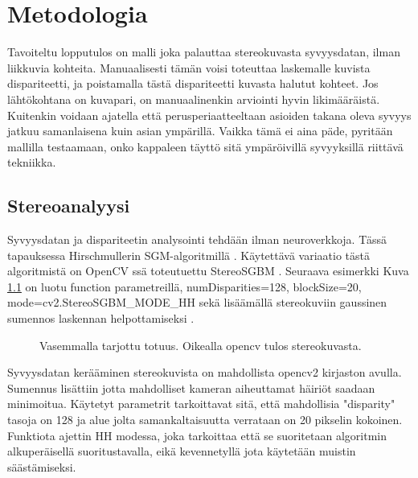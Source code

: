 \chapter{Metodologia}
\label{ch:metodologia}

Tavoiteltu lopputulos on malli joka palauttaa stereokuvasta syvyysdatan, ilman liikkuvia kohteita.
Manuaalisesti tämän voisi toteuttaa laskemalle kuvista dispariteetti, ja poistamalla tästä dispariteetti kuvasta halutut kohteet.
Jos lähtökohtana on kuvapari, on manuaalinenkin arviointi hyvin likimääräistä. Kuitenkin voidaan ajatella että perusperiaatteeltaan asioiden takana oleva syvyys jatkuu samanlaisena kuin asian ympärillä.
Vaikka tämä ei aina päde, pyritään mallilla testaamaan, onko kappaleen täyttö sitä ympäröivillä syvyyksillä riittävä tekniikka.

\section{Stereoanalyysi}

Syvyysdatan ja dispariteetin analysointi tehdään ilman neuroverkkoja.
Tässä tapauksessa Hirschmullerin SGM-algoritmillä \cite{hirschmuller2005babel}.
Käytettävä variaatio tästä algoritmistä on OpenCV ssä toteutuettu StereoSGBM \cite{opencvsgbm}.
Seuraava esimerkki Kuva  \ref{fig:disparity1} on luotu function parametreillä, numDisparities=128, blockSize=20, mode=cv2.StereoSGBM\_MODE\_HH
sekä lisäämällä stereokuviin gaussinen sumennos laskennan helpottamiseksi \cite{AnShiyong2021Asvs}.

\begin{figure}[h]
\centering
{}
\caption[Tämä on lyhyt kuvateksti.]{Vasemmalla tarjottu totuus. Oikealla opencv tulos stereokuvasta.}
\label{fig:disparity1}
\end{figure}
    
Syvyysdatan kerääminen stereokuvista on mahdollista opencv2 kirjaston avulla.
Sumennus lisättiin jotta mahdolliset kameran aiheuttamat häiriöt saadaan minimoitua.
Käytetyt parametrit tarkoittavat sitä, että mahdollisia "disparity" tasoja on 128 ja alue jolta samankaltaisuutta verrataan on 20 pikselin kokoinen.
Funktiota ajettin HH modessa, joka tarkoittaa että se suoritetaan algoritmin alkuperäisellä suoritustavalla, 
eikä kevennetyllä jota käytetään muistin säästämiseksi.

